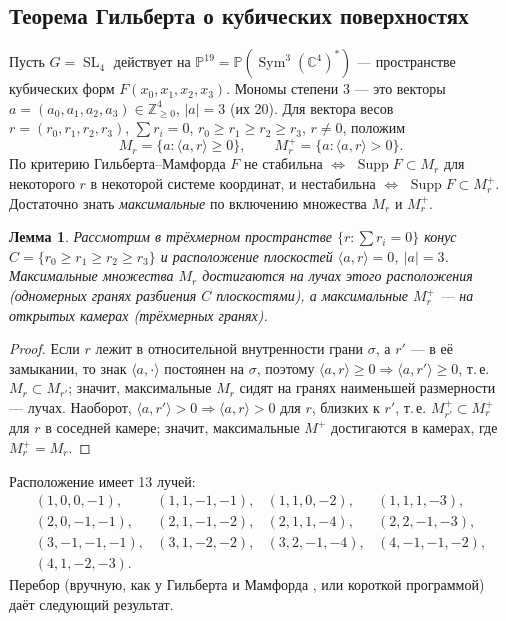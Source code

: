 \documentclass[11pt,a4paper]{article}
\theoremstyle{plain}
\newtheorem{lemma}[theorem]{Лемма}
\theoremstyle{definition}
\theoremstyle{remark}
\renewcommand{\C}{\mathbb{C}}
\newcommand{\Z}{\mathbb{Z}}
\newcommand{\PP}{\mathbb{P}}
\DeclareMathOperator{\SL}{SL}
\DeclareMathOperator{\Sym}{Sym}
\DeclareMathOperator{\Supp}{Supp}
\begin{document}
\subsection{Теорема Гильберта о кубических поверхностях}\label{ss:Hilbert-cubic}

Пусть $G=\SL_4$ действует на $\PP^{19}=\PP(\Sym^3(\C^4)^*)$ --- пространстве кубических форм
$F(x_0,x_1,x_2,x_3)$. Мономы степени 3 --- это векторы $a=(a_0,a_1,a_2,a_3)\in\Z_{\ge0}^4$,
$|a|=3$ (их 20). Для вектора весов $r=(r_0,r_1,r_2,r_3)$, $\sum r_i=0$, $r_0\ge r_1\ge r_2\ge r_3$,
$r\ne0$, положим
\[
M_r=\{a:\langle a,r\rangle\ge0\},\qquad M_r^+=\{a:\langle a,r\rangle>0\}.
\]
По критерию Гильберта--Мамфорда $F$ не стабильна $\iff$ $\Supp F\subset M_r$ для некоторого $r$ в
некоторой системе координат, и нестабильна $\iff$ $\Supp F\subset M^+_r$. Достаточно знать
\emph{максимальные} по включению множества $M_r$ и $M_r^+$.

\begin{lemma}\label{lem:rays}
Рассмотрим в трёхмерном пространстве $\{r:\sum r_i=0\}$ конус $C=\{r_0\ge r_1\ge r_2\ge r_3\}$ и
расположение плоскостей $\langle a,r\rangle=0$, $|a|=3$. Максимальные множества $M_r$ достигаются
на \emph{лучах} этого расположения (одномерных гранях разбиения $C$ плоскостями), а максимальные
$M_r^+$ --- на открытых камерах (трёхмерных гранях).
\end{lemma}
\begin{proof}
Если $r$ лежит в относительной внутренности грани $\sigma$, а $r'$ --- в её замыкании, то знак
$\langle a,\cdot\rangle$ постоянен на $\sigma$, поэтому $\langle a,r\rangle\ge0\Rightarrow
\langle a,r'\rangle\ge0$, т.\,е. $M_r\subset M_{r'}$; значит, максимальные $M_r$ сидят на гранях
наименьшей размерности --- лучах. Наоборот, $\langle a,r'\rangle>0\Rightarrow\langle a,r\rangle>0$ для
$r$, близких к $r'$, т.\,е. $M^+_{r'}\subset M^+_r$ для $r$ в соседней камере; значит, максимальные
$M^+$ достигаются в камерах, где $M^+_r=M_r$.
\end{proof}

Расположение имеет 13 лучей:
\[
\begin{array}{llll}
(1,0,0,-1),&(1,1,-1,-1),&(1,1,0,-2),&(1,1,1,-3),\\
(2,0,-1,-1),&(2,1,-1,-2),&(2,1,1,-4),&(2,2,-1,-3),\\
(3,-1,-1,-1),&(3,1,-2,-2),&(3,2,-1,-4),&(4,-1,-1,-2),\\
(4,1,-2,-3).&&&
\end{array}
\]
Перебор (вручную, как у Гильберта и Мамфорда \cite[гл.~4, \S\,2]{MFK}, или короткой программой)
даёт следующий результат.
\end{document}
